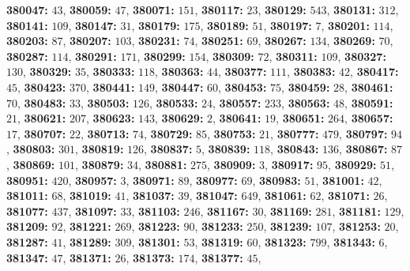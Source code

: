 \textsf{\bfseries 380047:} $43$, \textsf{\bfseries 380059:} $47$, \textsf{\bfseries 380071:} $151$, \textsf{\bfseries 380117:} $23$, \textsf{\bfseries 380129:} $543$, \textsf{\bfseries 380131:} $312$, \textsf{\bfseries 380141:} $109$, \textsf{\bfseries 380147:} $31$, \textsf{\bfseries 380179:} $175$, \textsf{\bfseries 380189:} $51$, \textsf{\bfseries 380197:} $7$, \textsf{\bfseries 380201:} $114$, \textsf{\bfseries 380203:} $87$, \textsf{\bfseries 380207:} $103$, \textsf{\bfseries 380231:} $74$, \textsf{\bfseries 380251:} $69$, \textsf{\bfseries 380267:} $134$, \textsf{\bfseries 380269:} $70$, \textsf{\bfseries 380287:} $114$, \textsf{\bfseries 380291:} $171$, \textsf{\bfseries 380299:} $154$, \textsf{\bfseries 380309:} $72$, \textsf{\bfseries 380311:} $109$, \textsf{\bfseries 380327:} $130$, \textsf{\bfseries 380329:} $35$, \textsf{\bfseries 380333:} $118$, \textsf{\bfseries 380363:} $44$, \textsf{\bfseries 380377:} $111$, \textsf{\bfseries 380383:} $42$, \textsf{\bfseries 380417:} $45$, \textsf{\bfseries 380423:} $370$, \textsf{\bfseries 380441:} $149$, \textsf{\bfseries 380447:} $60$, \textsf{\bfseries 380453:} $75$, \textsf{\bfseries 380459:} $28$, \textsf{\bfseries 380461:} $70$, \textsf{\bfseries 380483:} $33$, \textsf{\bfseries 380503:} $126$, \textsf{\bfseries 380533:} $24$, \textsf{\bfseries 380557:} $233$, \textsf{\bfseries 380563:} $48$, \textsf{\bfseries 380591:} $21$, \textsf{\bfseries 380621:} $207$, \textsf{\bfseries 380623:} $143$, \textsf{\bfseries 380629:} $2$, \textsf{\bfseries 380641:} $19$, \textsf{\bfseries 380651:} $264$, \textsf{\bfseries 380657:} $17$, \textsf{\bfseries 380707:} $22$, \textsf{\bfseries 380713:} $74$, \textsf{\bfseries 380729:} $85$, \textsf{\bfseries 380753:} $21$, \textsf{\bfseries 380777:} $479$, \textsf{\bfseries 380797:} $94$, \textsf{\bfseries 380803:} $301$, \textsf{\bfseries 380819:} $126$, \textsf{\bfseries 380837:} $5$, \textsf{\bfseries 380839:} $118$, \textsf{\bfseries 380843:} $136$, \textsf{\bfseries 380867:} $87$, \textsf{\bfseries 380869:} $101$, \textsf{\bfseries 380879:} $34$, \textsf{\bfseries 380881:} $275$, \textsf{\bfseries 380909:} $3$, \textsf{\bfseries 380917:} $95$, \textsf{\bfseries 380929:} $51$, \textsf{\bfseries 380951:} $420$, \textsf{\bfseries 380957:} $3$, \textsf{\bfseries 380971:} $89$, \textsf{\bfseries 380977:} $69$, \textsf{\bfseries 380983:} $51$, \textsf{\bfseries 381001:} $42$, \textsf{\bfseries 381011:} $68$, \textsf{\bfseries 381019:} $41$, \textsf{\bfseries 381037:} $39$, \textsf{\bfseries 381047:} $649$, \textsf{\bfseries 381061:} $62$, \textsf{\bfseries 381071:} $26$, \textsf{\bfseries 381077:} $437$, \textsf{\bfseries 381097:} $33$, \textsf{\bfseries 381103:} $246$, \textsf{\bfseries 381167:} $30$, \textsf{\bfseries 381169:} $281$, \textsf{\bfseries 381181:} $129$, \textsf{\bfseries 381209:} $92$, \textsf{\bfseries 381221:} $269$, \textsf{\bfseries 381223:} $90$, \textsf{\bfseries 381233:} $250$, \textsf{\bfseries 381239:} $107$, \textsf{\bfseries 381253:} $20$, \textsf{\bfseries 381287:} $41$, \textsf{\bfseries 381289:} $309$, \textsf{\bfseries 381301:} $53$, \textsf{\bfseries 381319:} $60$, \textsf{\bfseries 381323:} $799$, \textsf{\bfseries 381343:} $6$, \textsf{\bfseries 381347:} $47$, \textsf{\bfseries 381371:} $26$, \textsf{\bfseries 381373:} $174$, \textsf{\bfseries 381377:} $45$, 
